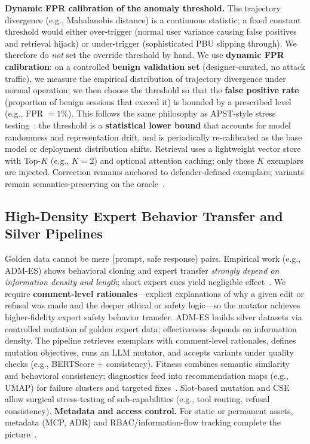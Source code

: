 \documentclass[letterpaper,twocolumn,10pt]{article}
\begin{document}
\textbf{Dynamic FPR calibration of the anomaly threshold.} The trajectory divergence (e.g., Mahalanobis distance) is a continuous statistic; a fixed constant threshold would either over-trigger (normal user variance causing false positives and retrieval hijack) or under-trigger (sophisticated PBU slipping through). We therefore do \emph{not} set the override threshold by hand. We use \textbf{dynamic FPR calibration}: on a controlled \textbf{benign validation set} (designer-curated, no attack traffic), we measure the empirical distribution of trajectory divergence under normal operation; we then choose the threshold so that the \textbf{false positive rate} (proportion of benign sessions that exceed it) is bounded by a prescribed level (e.g., FPR $= 1\%$). This follows the same philosophy as APST-style stress testing~\cite{apst}: the threshold is a \textbf{statistical lower bound} that accounts for model randomness and representation drift, and is periodically re-calibrated as the base model or deployment distribution shifts. Retrieval uses a lightweight vector store with Top-$K$ (e.g., $K=2$) and optional attention caching; only these $K$ exemplars are injected. Correction remains anchored to defender-defined exemplars; variants remain semantics-preserving on the oracle~\cite{ControlledMutation_SafetyEval,jade-linguistics}.

\subsection{High-Density Expert Behavior Transfer and Silver Pipelines}
\label{sec:silver}

Golden data cannot be mere (prompt, safe response) pairs. Empirical work (e.g., ADM-ES) shows behavioral cloning and expert transfer \emph{strongly depend on information density and length}; short expert cues yield negligible effect~\cite{adm-es-arxiv}. We require \textbf{comment-level rationales}---explicit explanations of why a given edit or refusal was made and the deeper ethical or safety logic---so the mutator achieves higher-fidelity expert safety behavior transfer. ADM-ES builds silver datasets via controlled mutation of golden expert data; effectiveness depends on information density. The pipeline retrieves exemplars with comment-level rationales, defines mutation objectives, runs an LLM mutator, and accepts variants under quality checks (e.g., BERTScore + consistency). Fitness combines semantic similarity and behavioral consistency; diagnostics feed into recommendation maps (e.g., UMAP) for failure clusters and targeted fixes~\cite{adm-es-arxiv}. Slot-based mutation and CSE~\cite{cse-evocontrol,cse-arxiv} allow surgical stress-testing of sub-capabilities (e.g., tool routing, refusal consistency). \textbf{Metadata and access control.}\label{sec:metadata} For static or permanent assets, metadata (MCP, ADR) and RBAC/information-flow tracking complete the picture~\cite{mcp-smell-arxiv,adr-violation,mission-critical-rag}.
\end{document}
